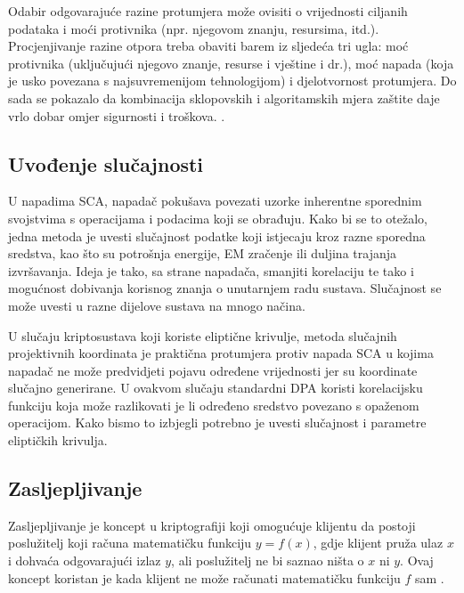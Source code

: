 \documentclass[times, utf8, diplomski]{fer}
\begin{document}
Odabir odgovarajuće razine protumjera može ovisiti o vrijednosti ciljanih podataka i moći protivnika (npr. njegovom znanju, resursima, itd.). Procjenjivanje razine otpora treba obaviti barem iz sljedeća tri ugla: moć protivnika (uključujući njegovo znanje, resurse i vještine i dr.), moć napada (koja je usko povezana s najsuvremenijom tehnologijom) i djelotvornost protumjera. Do sada se pokazalo da kombinacija sklopovskih i algoritamskih mjera zaštite daje vrlo dobar omjer sigurnosti i troškova. \citep{zhou2005side}.

\subsection{Uvođenje slučajnosti}

U napadima SCA, napadač pokušava povezati uzorke inherentne sporednim svojstvima s operacijama i podacima koji se obrađuju. Kako bi se to otežalo, jedna metoda je uvesti slučajnost podatke koji istjecaju kroz razne sporedna sredstva, kao što su potrošnja energije, EM zračenje ili duljina trajanja izvršavanja. Ideja je tako, sa strane napadača, smanjiti korelaciju te tako i mogućnost dobivanja korisnog znanja o unutarnjem radu sustava. Slučajnost se može uvesti u razne dijelove sustava na mnogo načina.

U slučaju kriptosustava koji koriste eliptične krivulje, metoda slučajnih projektivnih koordinata je praktična protumjera protiv napada SCA u kojima napadač ne može predvidjeti pojavu određene vrijednosti jer su koordinate slučajno generirane. U ovakvom slučaju standardni DPA koristi korelacijsku funkciju koja može razlikovati je li određeno sredstvo povezano s opaženom operacijom. Kako bismo to izbjegli potrebno je uvesti slučajnost i parametre eliptičkih krivulja.

\subsection{Zasljepljivanje}

Zasljepljivanje je koncept u kriptografiji koji omogućuje klijentu da postoji poslužitelj koji računa matematičku funkciju \(y = f(x)\), gdje klijent pruža ulaz \(x\) i dohvaća odgovarajući izlaz \(y\), ali poslužitelj ne bi saznao ništa o \(x\) ni \(y\). Ovaj koncept koristan je kada klijent ne može računati matematičku funkciju \(f\) sam \citep{Bleumer2011}.
\end{document}
